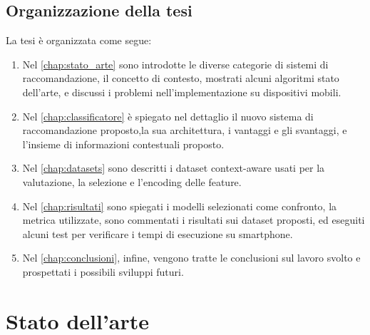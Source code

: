 \documentclass[12pt,italian]{report}
\begin{document}
\section{Organizzazione della tesi}
\label{sec:organizzazione}
La tesi è organizzata come segue: 
\begin{enumerate}
\item Nel \autoref{chap:stato_arte} sono introdotte le diverse categorie di sistemi di raccomandazione, il concetto di contesto, mostrati alcuni algoritmi stato dell'arte, e discussi i problemi nell'implementazione su dispositivi mobili.

\item Nel \autoref{chap:classificatore} è spiegato nel dettaglio il nuovo sistema di raccomandazione proposto,la sua architettura, i vantaggi e gli svantaggi, e l'insieme di informazioni contestuali proposto.

\item Nel \autoref{chap:datasets} sono descritti i dataset context-aware usati per la valutazione, la selezione e l'encoding delle feature.

\item Nel \autoref{chap:risultati} sono spiegati i modelli selezionati come confronto, la metrica utilizzate, sono commentati i risultati sui dataset proposti, ed eseguiti alcuni test per verificare i tempi di esecuzione su smartphone.

\item Nel \autoref{chap:conclusioni}, infine, vengono tratte le conclusioni sul lavoro svolto e prospettati i possibili sviluppi futuri. 
\end{enumerate}


% 
% 

\chapter{Stato dell'arte}
\label{chap:stato_arte}



% 
% 
\end{document}
